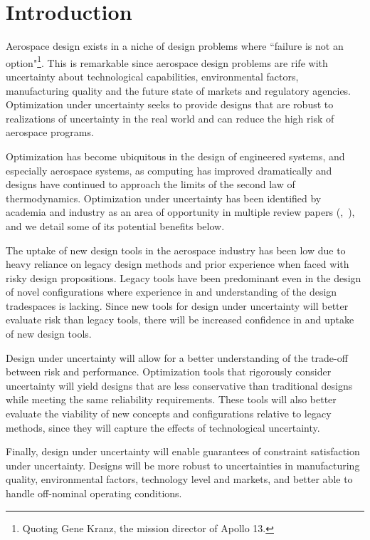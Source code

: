 \section{Introduction}

Aerospace design exists in a niche of design problems where ``failure is
not an option"\footnote{Quoting Gene Kranz, the mission director of Apollo 13.}.
This is remarkable since aerospace design problems are rife with uncertainty about
technological capabilities, environmental factors, manufacturing quality and the future
state of markets and regulatory agencies.
Optimization under uncertainty seeks to provide designs that are robust
to realizations of uncertainty in the real world and can reduce
the high risk of aerospace programs.

Optimization has become ubiquitous in the design of engineered systems, and especially aerospace systems,
as computing has improved dramatically and designs have
continued to approach the limits of the second law of thermodynamics. Optimization under uncertainty
has been identified by academia and industry as an area of opportunity
in multiple review papers (\cite{Zang2002},~\cite{Yao2011}),
and we detail some of its potential benefits below.

{\color{blue} The uptake of new design tools in the aerospace industry has been low
due to heavy reliance on legacy design methods and prior experience when
faced with risky design propositions. Legacy tools
have been predominant even in the design of novel configurations where experience in
and understanding of the design tradespaces is lacking. Since new tools for design under uncertainty
will better evaluate risk than legacy tools,
there will be increased confidence in and uptake of new design tools.

Design under uncertainty will allow for a better understanding of the trade-off between risk and
performance. {\color{blue} Optimization tools that rigorously consider uncertainty will yield designs that are
less conservative than
traditional designs while meeting the same reliability requirements. These tools
will also better evaluate the viability of new concepts and configurations relative to legacy methods,
since they will capture the effects of technological uncertainty.}

Finally, design under uncertainty will enable guarantees
of constraint satisfaction under uncertainty. Designs
will be more robust to uncertainties in manufacturing quality,
environmental factors, technology level and markets, and better able to
handle off-nominal operating conditions.}

